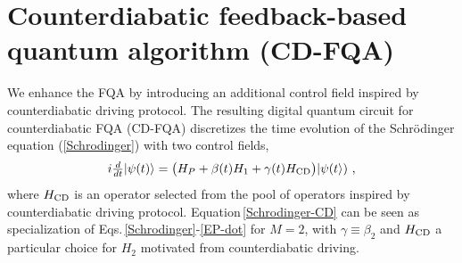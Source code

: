 \documentclass[twocolumn,aps,superscriptaddress,floatfix,longbibliography]{revtex4-2}
\newcommand{\EQ}[1]{Equation\,\eqref{#1}}
\newcommand{\Eqs}[1]{Eqs.\,\eqref{#1}}
\begin{document}



\section{Counterdiabatic feedback-based quantum algorithm (CD-FQA)}
\label{sec:CD-FQA}

We enhance the FQA by introducing an additional control field inspired by counterdiabatic driving protocol. The resulting digital
quantum circuit for counterdiabatic FQA (CD-FQA) 
discretizes the
time evolution of the Schr\"odinger equation (\ref{Schrodinger}) with two control fields,
\begin{equation}
  i\tfrac{d}{dt}|\psi(t)\rangle
  = \bigl(
       H_P + \beta(t) H_1 + \gamma(t) H_{\rm CD}
    \bigr)|\psi(t\rangle)
\text{ ,}\label{Schrodinger-CD}
\end{equation}
where $H_{\rm CD}$ is an operator selected from the pool of
operators inspired by counterdiabatic driving protocol. 
\EQ{Schrodinger-CD} can be seen as specialization
of \Eqs{Schrodinger}-\eqref{EP-dot} for $M=2$,
with $\gamma \equiv \beta_2$ and $H_{\rm CD}$
a particular choice for $H_2$ motivated from 
counterdiabatic driving.
\end{document}
